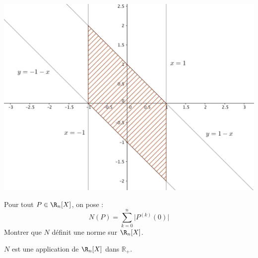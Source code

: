 \documentclass[a4paper,10pt]{report}
\begin{document}
\begin{enumerate}
\medskip

\begin{center}
\includegraphics[scale=0.4]{BouleU}
\end{center}
\end{enumerate}

\begin{Exercice}{} Pour tout $P  \in \R_n[X ]$, on pose :
$$N(P) = \sum_{k = 0}^{ n } \vert P^{(k)} (0) \vert $$
Montrer que $N$ définit une norme sur $\R_n [X]$.
\end{Exercice}

\corr $N$ est une application de $\R_n[X ]$ dans $\mathbb{R}_+$.
\end{document}
